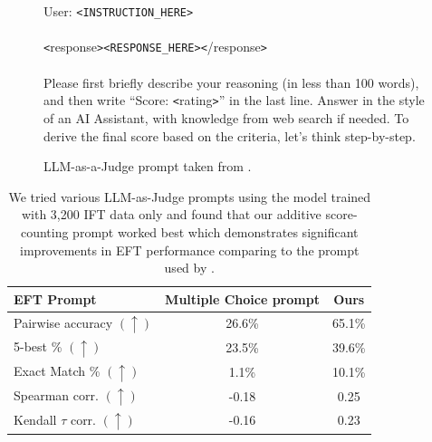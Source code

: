 \documentclass{article}
\begin{document}
\begin{figure}[t]
\begin{tcolorbox}
\\
\\
User: \texttt{\color{red}<INSTRUCTION\_HERE>}\\
\\
\texttt{<}response\texttt{>}\texttt{\color{red}<RESPONSE\_HERE>}\texttt{<}/response\texttt{>}\\
\\
Please first briefly describe your reasoning (in less than 100 words), and then write ``Score: \texttt{<}rating\texttt{>}'' in the last line. Answer in the style of an AI Assistant, with knowledge from web search if needed. To derive the final score based on the criteria, let's think step-by-step.
\end{tcolorbox}
\caption{LLM-as-a-Judge prompt taken from \citet{li2023self}.}
\label{tab:eval_prompt_xian}
\end{figure}

\begin{table}[h]
\begin{center}
\begin{small}
\begin{sc}
  \setlength\tabcolsep{20pt}
\begin{tabular}{lcc}

\toprule

EFT Prompt             &   Multiple Choice prompt   &  Ours \\
\midrule
Pairwise accuracy $(\uparrow)$ & 26.6\% & 65.1\%\\
5-best \%    $(\uparrow)$ &  23.5\%  & 39.6\% \\
Exact Match \%  $(\uparrow)$ &  1.1\% & 10.1\% \\
Spearman corr. $(\uparrow)$ & -0.18 & 0.25 \\
Kendall $\tau$ corr.    $(\uparrow)$ & -0.16 & 0.23 \\
\bottomrule
\end{tabular}
\end{sc}
\end{small}
\end{center}
\caption{We tried various LLM-as-Judge prompts using the model trained with 3,200 IFT data only and found that our additive score-counting prompt worked best which demonstrates significant improvements in EFT performance comparing to the prompt used by \citet{li2023self}. 
\label{tab:compare_eft_prompt}
}
\end{table}
\end{document}
